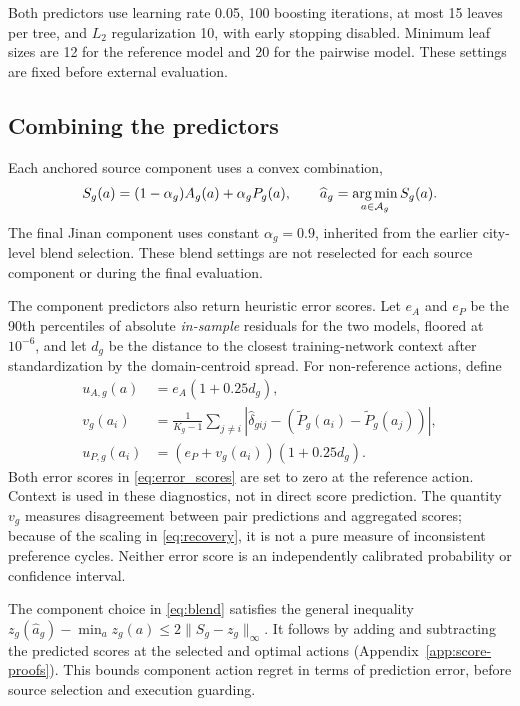 Both predictors use learning rate 0.05, 100 boosting iterations, at most 15 leaves per tree, and $L_2$ regularization 10, with early stopping disabled. Minimum leaf sizes are 12 for the reference model and 20 for the pairwise model. These settings are fixed before external evaluation.

\subsection{Combining the predictors}
Each anchored source component uses a convex combination,
\begin{equation}
 S_g(a)=(1-\alpha_g)A_g(a)+\alpha_gP_g(a),\qquad
 \widehat a_g=\operatorname*{arg\,min}_{a\in\mathcal A_g}S_g(a).
 \label{eq:blend}
\end{equation}
The final Jinan component uses constant $\alpha_g=0.9$, inherited from the earlier city-level blend selection. These blend settings are not reselected for each source component or during the final evaluation.

The component predictors also return heuristic error scores. Let $e_A$ and $e_P$ be the 90th percentiles of absolute \emph{in-sample} residuals for the two models, floored at $10^{-6}$, and let $d_g$ be the distance to the closest training-network context after standardization by the domain-centroid spread. For non-reference actions, define
\begin{align}
 u_{A,g}(a)&=e_A(1+0.25d_g),\nonumber\\
 v_g(a_i)&=\frac{1}{K_g-1}\sum_{j\ne i}
 \left|\widehat\delta_{gij}-(\widetilde P_g(a_i)-\widetilde P_g(a_j))\right|,\nonumber\\
 u_{P,g}(a_i)&=(e_P+v_g(a_i))(1+0.25d_g).
 \label{eq:error_scores}
\end{align}
Both error scores in \eqref{eq:error_scores} are set to zero at the reference action. Context is used in these diagnostics, not in direct score prediction. The quantity $v_g$ measures disagreement between pair predictions and aggregated scores; because of the scaling in \eqref{eq:recovery}, it is not a pure measure of inconsistent preference cycles. Neither error score is an independently calibrated probability or confidence interval.

The component choice in \eqref{eq:blend} satisfies the general inequality $z_g(\widehat a_g)-\min_a z_g(a)\leq2\|S_g-z_g\|_\infty$. It follows by adding and subtracting the predicted scores at the selected and optimal actions (Appendix~\ref{app:score-proofs}). This bounds component action regret in terms of prediction error, before source selection and execution guarding.

